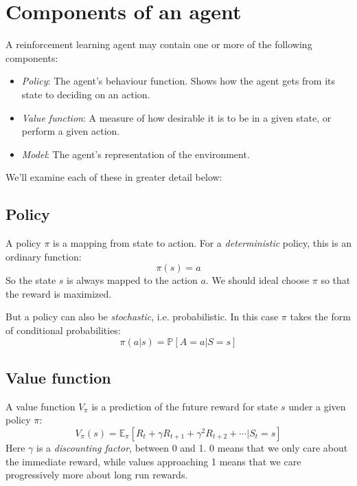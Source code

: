 \documentclass[12pt, a4paper]{article}
\numberwithin{equation}{section}
\begin{document}
\section{Components of an agent}
A reinforcement learning agent may contain one or more of the following components:
\begin{itemize}
\item \textit{Policy}: The agent's behaviour function. Shows how the agent gets from its state to deciding on an action.
\item \textit{Value function}: A measure of how desirable it is to be in a given state, or perform a given action.
\item \textit{Model}: The agent's representation of the environment.
\end{itemize}
We'll examine each of these in greater detail below:

\subsection{Policy}
A policy $\pi$ is a mapping from state to action. For a \textit{deterministic} policy, this is an ordinary function:
\begin{equation}
\pi(s)=a
\end{equation}
So the state $s$ is always mapped to the action $a$. We should ideal choose $\pi$ so that the reward is maximized. 

But a policy can also be \textit{stochastic}, i.e. probabilistic. In this case $\pi$ takes the form of conditional probabilities:
\begin{equation}
\pi(a|s)=\mathbb{P}[A=a|S=s]
\end{equation}

\subsection{Value function}
A value function $V_\pi$ is a prediction of the future reward for state $s$ under a given policy $\pi$:
\begin{equation}
V_\pi(s)=\mathbb{E}_\pi[R_t+\gamma R_{t+1}+\gamma^2 R_{t+2}+\cdots|S_t=s]
\end{equation}
Here $\gamma$ is a \textit{discounting factor}, between 0 and 1. 0 means that we only care about the immediate reward, while values approaching 1 means that we care progressively more about long run rewards.
\end{document}
